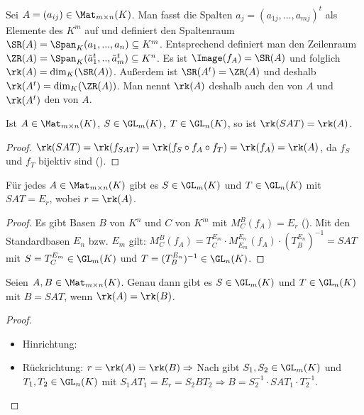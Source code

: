 \begin{remark}
	Sei $A=(a_{ij})\in \Mat_{m\times n}(K)$. Man fasst die Spalten $a_j=(a_{1j},...,a_{mj})^t$ als Elemente des $K^m$ auf 
	und definiert den Spaltenraum $\SR(A)=\Span_K(a_1,...,a_n)\subseteq K^m$. Entsprechend definiert man den Zeilenraum $\ZR(A)=\Span_K(
	\tilde a_1^t,..,\tilde a_m^t)\subseteq K^n$. Es ist $\Image(f_A)=\SR(A)$ und folglich $\rk(A)=\dim_K(\SR(A))$. Außerdem ist $\SR(A^t)=\ZR(A)$ 
	und deshalb $\rk(A^t)=\dim_K(\ZR(A))$. Man nennt $\rk(A)$ deshalb auch den  von $A$ und $\rk(A^t)$ den  von $A$.
\end{remark}

\begin{lemma}
	Ist $A\in \Mat_{m\times n}(K)$, $S\in \GL_m(K)$, $T\in \GL_n(K)$, so ist $\rk(SAT)=\rk(A)$.
\end{lemma}
\begin{proof}
	$\rk(SAT)=\rk(f_{SAT})=\rk(f_S\circ f_A\circ f_T)=\rk(f_A)=\rk(A)$, da $f_S$ und $f_T$ bijektiv sind ().
\end{proof}

\begin{proposition}
	Für jedes $A\in \Mat_{m\times n}(K)$ gibt es $S\in \GL_m(K)$ und $T\in \GL_n(K)$ mit $SAT=E_r$, wobei $r=\rk(A)$.
\end{proposition}
\begin{proof}
	Es gibt Basen $B$ von $K^n$ und $C$ von $K^m$ mit $M_C^B(f_A)=E_r$ (). Mit den Standardbasen $E_n$ bzw. $E_m$ gilt: $M_C^B(f_A)=T_C^{E_m}
	\cdot M_{E_m}^{E_n}(f_A)\cdot (T_B^{E_n})^{-1}=SAT$ mit $S=T_C^{E_m}\in \GL_m(K)$ und $T=(T_B^{E_n})^{-1}\in \GL_n(K)$.
\end{proof}

\begin{conclusion}
	Seien $A,B\in \Mat_{m\times n}(K)$. Genau dann gibt es $S\in \GL_m(K)$ und $T\in \GL_n(K)$ mit $B=SAT$, wenn 
	$\rk(A)=\rk(B)$.
\end{conclusion}
\begin{proof}
	\begin{itemize}
		\item Hinrichtung: 
		\item Rückrichtung: $r=\rk(A)=\rk(B)\Rightarrow$ Nach  gibt $S_1,S_2\in \GL_m(K)$ und $T_1,T_2\in \GL_n(K)$ mit $S_1AT_1=E_r=S_2BT_2 \Rightarrow 
		B=S_2^{-1}\cdot SAT_1\cdot T_2^{-1}$.
	\end{itemize}
\end{proof}

